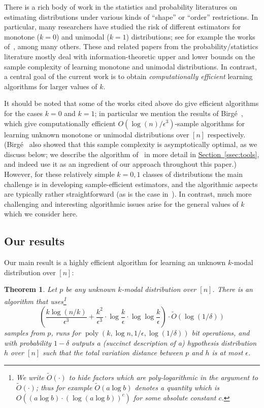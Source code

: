 \documentclass[10pt]{article}
\newtheorem{theorem}{Theorem}[section]
\theoremstyle{definition}
\numberwithin{equation}{section}
\newcommand{\expref}[2]{\texorpdfstring{\hyperref[#2]{#1~\ref{#2}}}{#1~\ref{#2}}}
\newcommand{\eps}{\epsilon}
\newcommand{\poly}{\operatorname{poly}}
\begin{document}
%

There is a rich body of work in the statistics and probability literatures 
on estimating distributions under various kinds of ``shape'' or ``order'' 
restrictions.  In particular, many researchers have studied the risk of 
different estimators for monotone  {($k=0$)} 
and unimodal  {($k=1$)} distributions; see for 
example the works of~\cite{PrakasaRao:69,Wegman:70,Groeneboom:85,Birge:87, 
Birge:87b, Birge:97}, among many others.
These and related papers from the probability/statistics literature 
mostly deal with information-theoretic
upper and lower bounds on the sample complexity of learning 
monotone and unimodal distributions.  
 {In contrast, a central goal of the current work is to 
obtain \emph{computationally efficient} learning algorithms for
larger values of $k$.} 

It should be noted that some of the works cited above 
do give efficient algorithms for the cases $k=0$ and $k=1$; 
in particular we mention the results of Birg\'{e}~\cite{Birge:87b,Birge:97}, 
which give computationally efficient $O(\log(n)/\eps^3)$-sample algorithms 
for learning unknown monotone or unimodal distributions over $[n]$ 
respectively.
(Birg\'{e}~\cite{Birge:87} also showed that this sample
complexity is asymptotically optimal, as we discuss below; we describe 
the algorithm of~\cite{Birge:87b} in more detail
in \expref{Section}{ssec:tools}, and indeed use it as an ingredient of our 
approach throughout this paper.)  
However, for these relatively simple $k=0,1$ classes of distributions the 
main challenge is in developing sample-efficient estimators, and the 
algorithmic aspects are typically rather straightforward (as is the case 
in~\cite{Birge:87b}).  In contrast, much more challenging and interesting 
algorithmic issues arise for the general values of $k$ which we consider here.

\subsection{Our results}


Our main result is a highly efficient algorithm for learning an unknown
$k$-modal distribution over $[n]$:


\begin{theorem} \label{thm:main}
Let $p$ be any unknown $k$-modal distribution over $[n]$.  There is an algorithm that uses\footnote{We
write $\tilde{O}(\cdot)$ to hide factors which are poly-logarithmic
in the argument to $\tilde{O}(\cdot)$;
thus for example $\tilde{O}(a \log b)$ denotes a quantity
which is $O((a \log b) \cdot  (\log (a \log b))^c)$ for some
absolute constant $c$.}
%
\[
\left ( {\frac {k\log(n/k)}{\eps^3}}  +   \frac{ {k^2}}{\eps^3} \cdot \log {\frac k \eps} \cdot
\log\log {\frac k \eps} \right )
\cdot \tilde{O}(\log(1/\delta))
\]
%
samples from $p$, runs for $\poly(k, \log n, 1/\eps,\log(1/\delta))$
bit operations, and with probability $1-\delta$ outputs a (succinct description of a) hypothesis
distribution $h$ over $[n]$ such that the total variation distance between $p$ and $h$ is
at most $\eps$.
\end{theorem}
\end{document}
